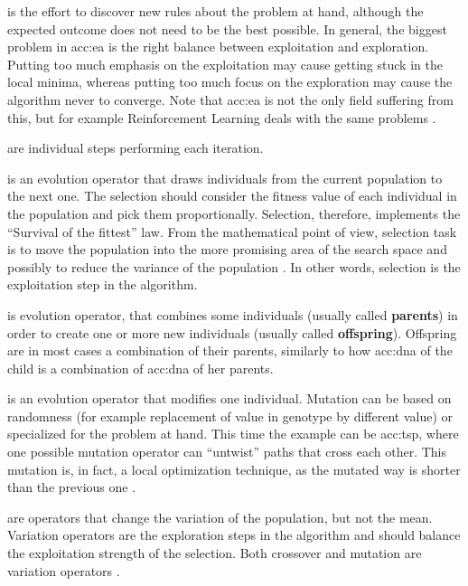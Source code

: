  is the effort to discover new rules about the problem at hand, although the expected outcome does not need to be the best possible. In general, the biggest problem in \acrshort{acc:ea} is the right balance between exploitation and exploration. Putting too much emphasis on the exploitation may cause getting stuck in the local minima, whereas putting too much focus on the exploration may cause the algorithm never to converge. Note that \acrshort{acc:ea} is not the only field suffering from this, but for example Reinforcement Learning deals with the same problems \citep{ExplorationExploitationDilemaRL}. 

 are individual steps performing each iteration.

 is an evolution operator that draws individuals from the current population to the next one. The selection should consider the fitness value of each individual in the population and pick them proportionally. Selection, therefore, implements the \enquote{Survival of the fittest} law. From the mathematical point of view, selection task is to move the population into the more promising area of the search space and possibly to reduce the variance of the population \citep{SelfAdaptiveFeaturesInRealParameterEvolutionaryAlgorithms}. In other words, selection is the exploitation step in the algorithm.

 is evolution operator, that combines some individuals (usually called \textbf{parents}) in order to create one or more new individuals (usually called \textbf{offspring}). Offspring are in most cases a combination of their parents, similarly to how \acrshort{acc:dna} of the child is a combination of \acrshort{acc:dna} of her parents.

 is an evolution operator that modifies one individual. Mutation can be based on randomness (for example replacement of value in genotype by different value) or specialized for the problem at hand. This time the example can be \acrlong{acc:tsp}, where one possible mutation operator can \enquote{untwist} paths that cross each other. This mutation is, in fact, a local optimization technique, as the mutated way is shorter than the previous one \citep{TSPArticle}.

 are operators that change the variation of the population, but not the mean. Variation operators are the exploration steps in the algorithm and should balance the exploitation strength of the selection. Both crossover and mutation are variation operators \citep{SelfAdaptiveFeaturesInRealParameterEvolutionaryAlgorithms}.

